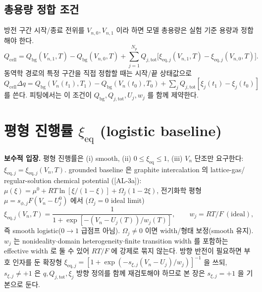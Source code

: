 \documentclass[11pt,a4paper]{article}
\newcommand{\eq}{\mathrm{eq}}
\newcommand{\tot}{\mathrm{tot}}
\newcommand{\bg}{\mathrm{bg}}
\newcommand{\cell}{\mathrm{cell}}
\newcommand{\AL}[1]{\textsf{[AL-#1]}}
\begin{document}
\subsection{총용량 정합 조건}\label{sec:capmatch}
방전 구간 시작/종료 전위를 $V_{n,0},V_{n,1}$ 이라 하면 모델 총용량은 실험 기준 용량과 정합해야 한다.
\begin{equation}
Q_\cell=Q_\bg(V_{n,1},T)-Q_\bg(V_{n,0},T)+\sum_{j=1}^{N_p}Q_{j,\tot}\big[\xi_{\eq,j}(V_{n,1},T)-\xi_{\eq,j}(V_{n,0},T)\big].
\label{eq:capmatch}
\end{equation}
동역학 경로의 특정 구간을 직접 정합할 때는 시작/끝 상태값으로
$Q_\cell\Delta q=Q_\bg(V_n(t_1),T_1)-Q_\bg(V_n(t_0),T_0)+\sum_j Q_{j,\tot}[\xi_j(t_1)-\xi_j(t_0)]$ 를 쓴다.
피팅에서는 이 조건이 $Q_\bg,Q_{j,\tot},U_j,w_j$ 를 함께 제약한다.

\section{평형 진행률 $\xi_\eq$ (logistic baseline)}\label{sec:eq}
\textbf{보수적 입장.} 평형 진행률은 (i) smooth, (ii) $0\le\xi_\eq\le1$, (iii) $V_n$ 단조만 요구한다:
$\xi_{\eq,j}=\xi_{\eq,j}(V_n,T)$. grounded baseline 은 graphite intercalation 의 lattice-gas/
regular-solution chemical potential \cite{mckinnon1983,bazant2013}(\AL{3a}):
$\mu(\xi)=\mu^0+RT\ln[\xi/(1-\xi)]+\Omega_j(1-2\xi)$, 전기화학 평형 $\mu=s_{\phi,j}F(V_n-U_j^0)$ 에서
($\Omega_j=0$ ideal limit)
\begin{equation}
\xi_{\eq,j}(V_n,T)=\frac{1}{1+\exp[-(V_n-U_j(T))/w_j(T)]},\qquad w_j=RT/F\ (\text{ideal}),
\label{eq:logistic}
\end{equation}
즉 smooth logistic($0\!\to\!1$ 급점프 아님). $\Omega_j\ne0$ 이면 width/형태 보정(smooth 유지). $w_j$ 는
nonideality$\cdot$domain heterogeneity$\cdot$finite transition width 를 포함하는 effective width 로
둘 수 있어 $RT/F$ 에 강제로 묶지 않는다. 방향 반전이 필요하면 부호 인자를 둔 확장형
$\xi_{\eq,j}=[1+\exp(-s_{\xi,j}(V_n-U_j)/w_j)]^{-1}$ 을 쓰되, $s_{\xi,j}\ne+1$ 은 $q,Q_{j,\tot},\xi_j$
방향 정의를 함께 재검토해야 하므로 본 장은 $s_{\xi,j}=+1$ 을 기본으로 둔다.
\end{document}
